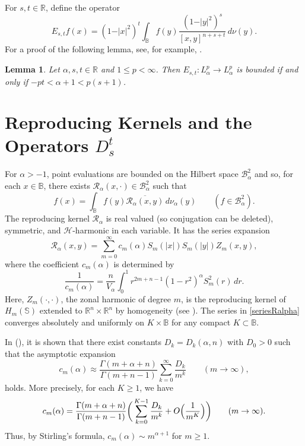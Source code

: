 \documentclass{amsart}
\newtheorem{lemma}[theorem]{Lemma}
\theoremstyle{definition}
\theoremstyle{remark}
\begin{document}
For $s,t\in\mathbb R$, define the operator
\begin{equation*}
E_{s,t} f(x)=(1-\vert x\vert^2)^t
\int_{\mathbb B} f(y)\frac{(1-\vert y\vert^2)^s}{[x,y]^{n+s+t}}\,d\nu(y).
\end{equation*}
For a proof of the following lemma, see, for example, \cite[Theorem 1.6]{GKU}.

\begin{lemma}\label{LEbdd}
Let $\alpha,s,t\in\mathbb R$ and $1\le p<\infty$.
Then $E_{s,t}\colon L^p_\alpha\to L^p_\alpha$ is bounded
if and only if $-pt<\alpha+1<p(s+1)$.
\end{lemma}

%
\section{Reproducing Kernels and the Operators $D^t_s$}\label{SRkernel}
%

For $\alpha>-1$, point evaluations are bounded on the Hilbert space
$\mathcal B^2_\alpha$ and so, for each $x\in\mathbb B$, there exists
$\mathcal R_\alpha(x,\cdot)\in\mathcal B^2_\alpha$ such that
\begin{equation*}
f(x)=\int_\mathbb B f(y)\overline{\mathcal R_\alpha(x,y)}\,d\nu_\alpha(y)
\qquad (f\in\mathcal B^2_\alpha).
\end{equation*}
The reproducing kernel $\mathcal R_\alpha$ is real valued (so
conjugation can be deleted), symmetric, and $\mathcal H$-harmonic
in each variable.
It has the series expansion
\begin{equation}\label{seriesRalpha}
\mathcal R_\alpha(x,y)=\sum_{m=0}^\infty
c_m(\alpha)S_m(\vert x\vert)S_m(\vert y\vert)Z_m(x,y),
\end{equation}
where the coefficient $c_m(\alpha)$ is determined by
\begin{equation*}
\frac{1}{c_m(\alpha)}
=\frac{n}{V_\alpha}
\int_0^1 r^{2m+n-1}(1-r^2)^\alpha S_m^2(r)\,dr.
\end{equation*}
Here, $Z_m(\cdot,\cdot)$, the zonal harmonic of degree $m$, is the
reproducing kernel of $H_m(\mathbb S)$ extended to
$\mathbb R^n\times\mathbb R^n$ by homogeneity (see \cite[Chapter 5]{ABR}).
The series in \eqref{seriesRalpha} converges absolutely and uniformly on
$K\times\mathbb B$ for any compact $K\subset\mathbb B$.

In (\cite[Corollary 3.4]{U}), it is shown that there exist constants
$D_k=D_k(\alpha,n)$ with $D_0>0$ such that the asymptotic expansion
\begin{equation}\label{cmbig}
c_m(\alpha)\approx\frac{\Gamma(m+\alpha+n)}{\Gamma(m+n-1)}
\sum_{k=0}^\infty \frac{D_k}{m^k}
\qquad (m\to\infty),
\end{equation}
holds.
More precisely, for each $K\ge 1$, we have
\begin{equation*}
c_m(\alpha)=\frac{\Gamma(m+\alpha+n)}{\Gamma(m+n-1)}
\biggl(\,\sum_{k=0}^{K-1}\frac{D_k}{m^k}+O\Bigl(\frac{1}{m^K}\Bigr)\biggr)
\qquad (m\to\infty).
\end{equation*}
Thus, by Stirling's formula, $c_m(\alpha)\sim m^{\alpha+1}$ for $m\ge 1$.
\end{document}
